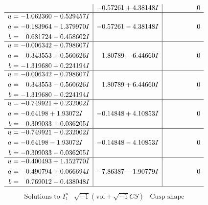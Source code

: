 \documentclass[1p]{elsarticle_modified}
\theoremstyle{definition}
\newcommand{\I}{\sqrt{-1}}
\begin{document}
$$\begin{array}{c|c|c}
 & -0.57261 + 4.38148 I & \phantom{-0.000000 } 0 \\ \hline\begin{aligned}
u &= -1.062360 - 0.529457 I \\
a &= -0.183964 - 1.379970 I \\
b &= \phantom{-}0.681724 - 0.458602 I\end{aligned}
 & -0.57261 - 4.38148 I & \phantom{-0.000000 } 0 \\ \hline\begin{aligned}
u &= -0.006342 + 0.798607 I \\
a &= \phantom{-}0.343553 + 0.560626 I \\
b &= -1.319680 + 0.224194 I\end{aligned}
 & \phantom{-}1.80789 - 6.44660 I & \phantom{-0.000000 } 0 \\ \hline\begin{aligned}
u &= -0.006342 - 0.798607 I \\
a &= \phantom{-}0.343553 - 0.560626 I \\
b &= -1.319680 - 0.224194 I\end{aligned}
 & \phantom{-}1.80789 + 6.44660 I & \phantom{-0.000000 } 0 \\ \hline\begin{aligned}
u &= -0.749921 + 0.232002 I \\
a &= -0.64198 + 1.93072 I \\
b &= -0.309033 + 0.036205 I\end{aligned}
 & -0.14848 + 4.10853 I & \phantom{-0.000000 } 0 \\ \hline\begin{aligned}
u &= -0.749921 - 0.232002 I \\
a &= -0.64198 - 1.93072 I \\
b &= -0.309033 - 0.036205 I\end{aligned}
 & -0.14848 - 4.10853 I & \phantom{-0.000000 } 0 \\ \hline\begin{aligned}
u &= -0.400493 + 1.152770 I \\
a &= -0.490794 + 0.066694 I \\
b &= \phantom{-}0.769012 - 0.438048 I\end{aligned}
 & -7.86387 - 1.90779 I & \phantom{-0.000000 } 0\\
 \hline 
 \end{array}$$\newpage$$\begin{array}{c|c|c}  
\text{Solutions to }I^u_{1}& \I (\text{vol} + \sqrt{-1}CS) & \text{Cusp shape}\\

\end{array}$$
\end{document}
